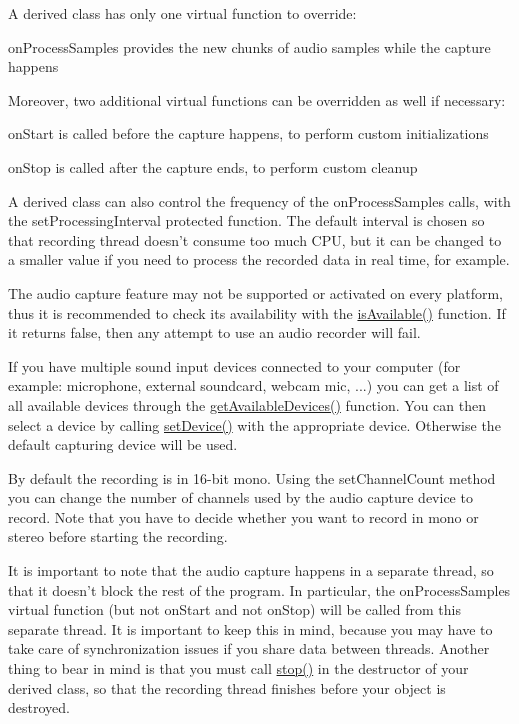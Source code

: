 A derived class has only one virtual function to override\-: \begin{DoxyItemize}
\item on\-Process\-Samples provides the new chunks of audio samples while the capture happens\end{DoxyItemize}
Moreover, two additional virtual functions can be overridden as well if necessary\-: \begin{DoxyItemize}
\item on\-Start is called before the capture happens, to perform custom initializations \item on\-Stop is called after the capture ends, to perform custom cleanup\end{DoxyItemize}
A derived class can also control the frequency of the on\-Process\-Samples calls, with the set\-Processing\-Interval protected function. The default interval is chosen so that recording thread doesn't consume too much C\-P\-U, but it can be changed to a smaller value if you need to process the recorded data in real time, for example.

The audio capture feature may not be supported or activated on every platform, thus it is recommended to check its availability with the \hyperlink{classsf_1_1_sound_recorder_aab2bd0fee9e48d6cfd449b1cb078ce5a}{is\-Available()} function. If it returns false, then any attempt to use an audio recorder will fail.

If you have multiple sound input devices connected to your computer (for example\-: microphone, external soundcard, webcam mic, ...) you can get a list of all available devices through the \hyperlink{classsf_1_1_sound_recorder_a26198c5c11efcd61f426f326fe314afe}{get\-Available\-Devices()} function. You can then select a device by calling \hyperlink{classsf_1_1_sound_recorder_a8eb3e473292c16e874322815836d3cd3}{set\-Device()} with the appropriate device. Otherwise the default capturing device will be used.

By default the recording is in 16-\/bit mono. Using the set\-Channel\-Count method you can change the number of channels used by the audio capture device to record. Note that you have to decide whether you want to record in mono or stereo before starting the recording.

It is important to note that the audio capture happens in a separate thread, so that it doesn't block the rest of the program. In particular, the on\-Process\-Samples virtual function (but not on\-Start and not on\-Stop) will be called from this separate thread. It is important to keep this in mind, because you may have to take care of synchronization issues if you share data between threads. Another thing to bear in mind is that you must call \hyperlink{classsf_1_1_sound_recorder_a8d9c8346aa9aa409cfed4a1101159c4c}{stop()} in the destructor of your derived class, so that the recording thread finishes before your object is destroyed.

